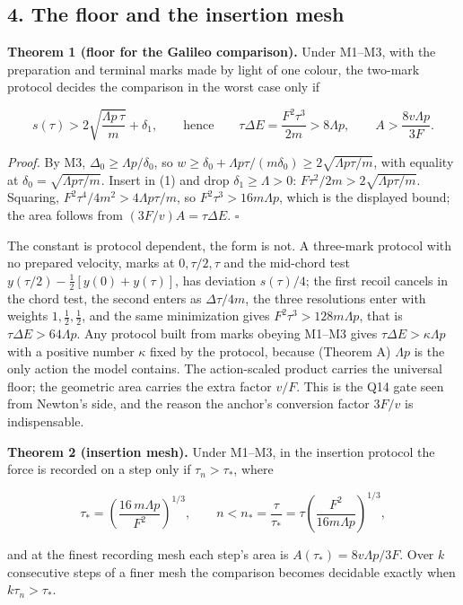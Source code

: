 \documentclass[11pt,a4paper]{article}
\begin{document}
\hypertarget{the-floor-and-the-insertion-mesh}{%
\subsection{4. The floor and the insertion
mesh}\label{the-floor-and-the-insertion-mesh}}

\textbf{Theorem 1 (floor for the Galileo comparison).} Under M1--M3,
with the preparation and terminal marks made by light of one colour, the
two-mark protocol decides the comparison in the worst case only if

\[s(\tau)>2\sqrt{\frac{\Lambda p\,\tau}{m}}+\delta_1,\qquad\text{hence}\qquad
\tau\Delta E=\frac{F^2\tau^3}{2m}>8\Lambda p,\qquad
A>\frac{8v\Lambda p}{3F}.\]

\emph{Proof.} By M3, \(\Delta_0\ge\Lambda p/\delta_0\), so
\(w\ge\delta_0+\Lambda p\tau/(m\delta_0)\ge2\sqrt{\Lambda p\tau/m}\),
with equality at \(\delta_0=\sqrt{\Lambda p\tau/m}\). Insert in (1) and
drop \(\delta_1\ge\Lambda>0\): \(F\tau^2/2m>2\sqrt{\Lambda p\tau/m}\).
Squaring, \(F^2\tau^4/4m^2>4\Lambda p\tau/m\), so
\(F^2\tau^3>16m\Lambda p\), which is the displayed bound; the area
follows from \((3F/v)A=\tau\Delta E\). \(\square\)

The constant is protocol dependent, the form is not. A three-mark
protocol with no prepared velocity, marks at \(0,\tau/2,\tau\) and the
mid-chord test \(y(\tau/2)-\tfrac12[y(0)+y(\tau)]\), has deviation
\(s(\tau)/4\); the first recoil cancels in the chord test, the second
enters as \(\Delta\tau/4m\), the three resolutions enter with weights
\(1,\tfrac12,\tfrac12\), and the same minimization gives
\(F^2\tau^3>128m\Lambda p\), that is \(\tau\Delta E>64\Lambda p\). Any
protocol built from marks obeying M1--M3 gives
\(\tau\Delta E>\kappa\Lambda p\) with a positive number \(\kappa\) fixed
by the protocol, because (Theorem A) \(\Lambda p\) is the only action
the model contains. The action-scaled product carries the universal
floor; the geometric area carries the extra factor \(v/F\). This is the
Q14 gate seen from Newton's side, and the reason the anchor's conversion
factor \(3F/v\) is indispensable.

\textbf{Theorem 2 (insertion mesh).} Under M1--M3, in the insertion
protocol the force is recorded on a step only if \(\tau_n>\tau_*\),
where

\[\tau_*=\left(\frac{16\,m\Lambda p}{F^2}\right)^{1/3},\qquad
n<n_*=\frac{\tau}{\tau_*}=\tau\left(\frac{F^2}{16m\Lambda p}\right)^{1/3},\]

and at the finest recording mesh each step's area is
\(A(\tau_*)=8v\Lambda p/3F\). Over \(k\) consecutive steps of a finer
mesh the comparison becomes decidable exactly when \(k\tau_n>\tau_*\).
\end{document}
